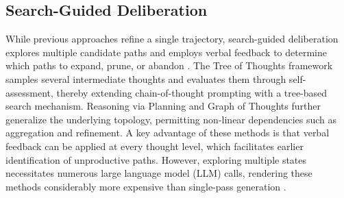 \subsection{Search-Guided Deliberation}%
\label{sec:search-guided}
While previous approaches refine a single trajectory, search-guided deliberation explores multiple candidate paths and employs verbal feedback to determine which paths to expand, prune, or abandon \citep{wang-etal-2025-dont}. The Tree of Thoughts framework \citep{yao2023tree} samples several intermediate thoughts and evaluates them through self-assessment, thereby extending chain-of-thought prompting \citep{wei2022chain} with a tree-based search mechanism. Reasoning via Planning \citep{hao2023reasoning} and Graph of Thoughts \citep{besta2024graph} further generalize the underlying topology, permitting non-linear dependencies such as aggregation and refinement. A key advantage of these methods is that verbal feedback can be applied at every thought level, which facilitates earlier identification of unproductive paths. However, exploring multiple states necessitates numerous large language model (LLM) calls, rendering these methods considerably more expensive than single-pass generation \citep{xie2023self}.




